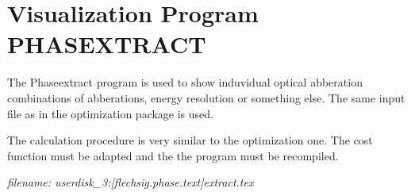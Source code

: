 
\chapter{Visualization Program PHASEXTRACT}   
The Phaseextract program is used to show induvidual optical abberation
combinations of abberations, energy resolution or something else. The same
input file as in the optimization package is used. 

The calculation procedure is very similar to the optimization one. The cost
function must be adapted and the the program must be recompiled.  


{\it filename: userdisk\_3:[flechsig.phase.text]extract.tex}     

